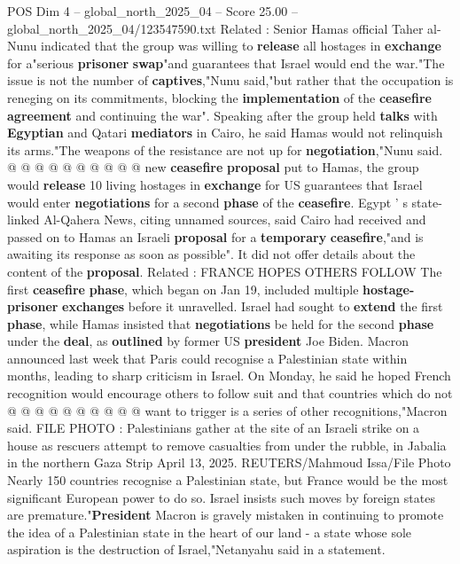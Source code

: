 \begin{textsample}{POS Dim 4 – global\_north\_2025\_04 – Score 25.00 – global\_north\_2025\_04/123547590.txt}
Related : Senior Hamas official Taher al-Nunu indicated that the group was willing to \textbf{release} all hostages in \textbf{exchange} for a"serious \textbf{prisoner} \textbf{swap}"and guarantees that Israel would end the war."The issue is not the number of \textbf{captives},"Nunu said,"but rather that the occupation is reneging on its commitments, blocking the \textbf{implementation} of the \textbf{ceasefire} \textbf{agreement} and continuing the war".
Speaking after the group held \textbf{talks} with \textbf{Egyptian} and Qatari \textbf{mediators} in Cairo, he said Hamas would not relinquish its arms."The weapons of the resistance are not up for \textbf{negotiation},"Nunu said. @ @ @ @ @ @ @ @ @ @ new \textbf{ceasefire} \textbf{proposal} put to Hamas, the group would \textbf{release} 10 living hostages in \textbf{exchange} for US guarantees that Israel would enter \textbf{negotiations} for a second \textbf{phase} of the \textbf{ceasefire}.
Egypt ' s state-linked Al-Qahera News, citing unnamed sources, said Cairo had received and passed on to Hamas an Israeli \textbf{proposal} for a \textbf{temporary} \textbf{ceasefire},"and is awaiting its response as soon as possible".
It did not offer details about the content of the \textbf{proposal}.
Related : FRANCE HOPES OTHERS FOLLOW The first \textbf{ceasefire} \textbf{phase}, which began on Jan 19, included multiple \textbf{hostage-prisoner} \textbf{exchanges} before it unravelled.
Israel had sought to \textbf{extend} the first \textbf{phase}, while Hamas insisted that \textbf{negotiations} be held for the second \textbf{phase} under the \textbf{deal}, as \textbf{outlined} by former US \textbf{president} Joe Biden.
Macron announced last week that Paris could recognise a Palestinian state within months, leading to sharp criticism in Israel.
On Monday, he said he hoped French recognition would encourage others to follow suit and that countries which do not @ @ @ @ @ @ @ @ @ @ want to trigger is a series of other recognitions,"Macron said.
FILE PHOTO : Palestinians gather at the site of an Israeli strike on a house as rescuers attempt to remove casualties from under the rubble, in Jabalia in the northern Gaza Strip April 13, 2025.
REUTERS/Mahmoud Issa/File Photo Nearly 150 countries recognise a Palestinian state, but France would be the most significant European power to do so.
Israel insists such moves by foreign states are premature."\textbf{President} Macron is gravely mistaken in continuing to promote the idea of a Palestinian state in the heart of our land - a state whose sole aspiration is the destruction of Israel,"Netanyahu said in a statement.

\end{textsample}
